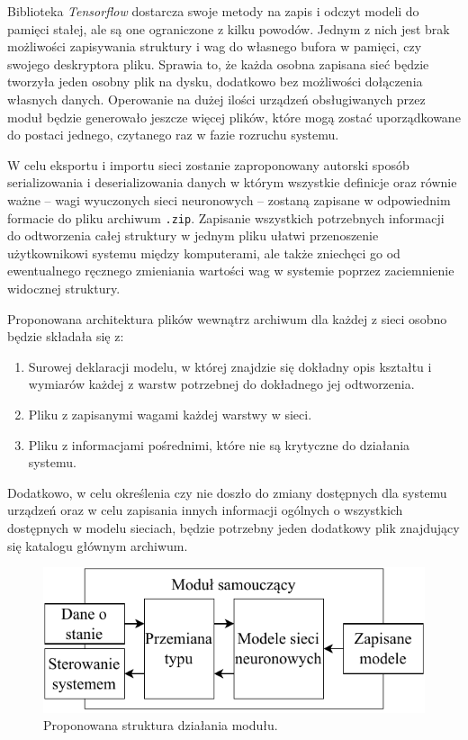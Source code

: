 Biblioteka \textit{Tensorflow} dostarcza swoje metody na zapis i odczyt modeli do pamięci stałej, ale są one ograniczone z kilku powodów. Jednym z nich jest brak możliwości zapisywania struktury i wag do własnego bufora w pamięci, czy swojego deskryptora pliku. Sprawia to, że każda osobna zapisana sieć będzie tworzyła jeden osobny plik na dysku, dodatkowo bez możliwości dołączenia własnych danych. Operowanie na dużej ilości urządzeń obsługiwanych przez moduł będzie generowało jeszcze więcej plików, które mogą zostać uporządkowane do postaci jednego, czytanego raz w fazie rozruchu systemu.

W celu eksportu i importu sieci zostanie zaproponowany autorski sposób serializowania i deserializowania danych \cite{book:serialization_deserialization} w którym wszystkie definicje oraz równie ważne -- wagi wyuczonych sieci neuronowych -- zostaną zapisane w odpowiednim formacie do pliku archiwum \verb+.zip+. Zapisanie wszystkich potrzebnych informacji do odtworzenia całej struktury w jednym pliku ułatwi przenoszenie użytkownikowi systemu między komputerami, ale także zniechęci go od ewentualnego ręcznego zmieniania wartości wag w systemie poprzez zaciemnienie widocznej struktury.

Proponowana architektura plików wewnątrz archiwum dla każdej z sieci osobno będzie składała się z:
\begin{enumerate}
    \item Surowej deklaracji modelu, w której znajdzie się dokładny opis kształtu i wymiarów każdej z warstw potrzebnej do dokładnego jej odtworzenia.
    \item Pliku z zapisanymi wagami każdej warstwy w sieci.
    \item Pliku z informacjami pośrednimi, które nie są krytyczne do działania systemu.
\end{enumerate}

Dodatkowo, w celu określenia czy nie doszło do zmiany dostępnych dla systemu urządzeń oraz w celu zapisania innych informacji ogólnych o wszystkich dostępnych w modelu sieciach, będzie potrzebny jeden dodatkowy plik znajdujący się katalogu głównym archiwum.

\begin{figure}[H]
    \centering\includegraphics[width=.55\textwidth]{img/architecture_module.pdf}
    \caption{Proponowana struktura działania modułu.} \label{fig:architektura_modułu}
\end{figure}


